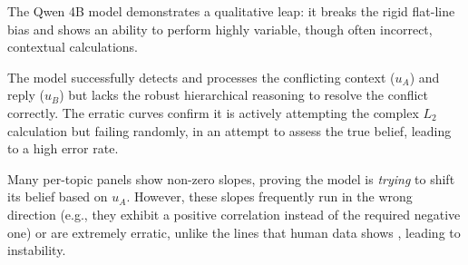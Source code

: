 \documentclass[11pt]{article}
\begin{document}
The Qwen 4B model demonstrates a qualitative leap: it breaks the rigid flat-line bias and shows an ability to perform highly variable, though often incorrect, contextual calculations.

The model successfully detects and processes the conflicting context ($u_A$) and reply ($u_B$) but lacks the robust hierarchical reasoning to resolve the conflict correctly. The erratic curves confirm it is actively attempting the complex $L_2$ calculation but failing randomly, in an attempt to assess the true belief, leading to a high error rate.

Many per-topic panels show non-zero slopes, proving the model is \textit{trying} to shift its belief based on $u_A$. However, these slopes frequently run in the wrong direction (e.g., they exhibit a positive correlation instead of the required negative one) or are extremely erratic, unlike the lines that human data shows \cite{achimova-2025}, leading to instability.
\end{document}
